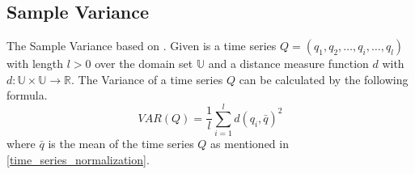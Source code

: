 \subsection{Sample Variance} \label{sample_variance}
The Sample Variance based on \cite{chan1983algorithms}. Given is a time series
$Q = (q_1, q_2, \dots, q_i, \dots, q_l)$ with length $l > 0$ over the domain set $\mathbb{U}$ and a distance measure
function $d$ with $d: \mathbb{U} \times \mathbb{U} \to \mathbb{R}$. The Variance of a time series $Q$ can be
calculated by the following formula.
\begin{equation}
    VAR(Q) = \frac{1}{l}\sum \limits_{i=1}^{l} d(q_i, \bar{q})^2
\end{equation}
where $\bar{q}$ is the mean of the time series $Q$ as mentioned in \ref{time_series_normalization}.
